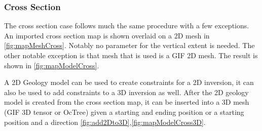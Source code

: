 \subsubsection{Cross Section}
\label{subsubsec:Make Geology Model from Map Cross Section}

The cross section case follows much the same procedure with a few exceptions. An imported cross section map is shown overlaid on a 2D mesh in \autoref{fig:mapMeshCross}. Notably no parameter for the vertical extent is needed. The other notable exception is that mesh that is used is a \ac{GIF} 2D mesh. The result is shown in \autoref{fig:mapModelCross}.  

A 2D Geology model can be used to create constraints for a 2D inversion, it can also be used to add constraints to a 3D inversion as well. After the 2D geology model is created from the cross section map, it can be inserted into a 3D mesh (\ac{GIF} 3D tensor or OcTree) given a starting and ending position or a starting position and a direction \autoref{fig:add2Dto3D},\autoref{fig:mapModelCross3D}.


